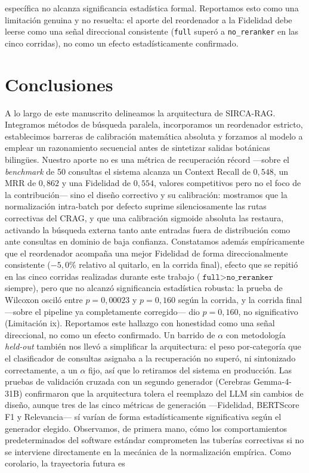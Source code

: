 \documentclass[runningheads]{llncs}
\newcommand{\sirca}{\textsc{SIRCA-RAG}}
\begin{document}
espec\'{i}fica no alcanza significancia estad\'{i}stica formal. Reportamos esto como una limitaci\'{o}n genuina y no resuelta: el aporte del reordenador a la Fidelidad debe leerse como una se\~{n}al direccional consistente (\texttt{full} super\'{o} a \texttt{no\_reranker} en las cinco corridas), no como un efecto estad\'{i}sticamente confirmado.

\section{Conclusiones}
\label{sec:conclusion}

A lo largo de este manuscrito delineamos la arquitectura de \sirca{}. Integramos m\'{e}todos de b\'{u}squeda paralela, incorporamos un reordenador estricto, establecimos barreras de calibraci\'{o}n matem\'{a}tica absoluta y forzamos al modelo a emplear un razonamiento secuencial antes de sintetizar salidas bot\'{a}nicas biling\"{u}es. Nuestro aporte no es una m\'{e}trica de recuperaci\'{o}n r\'{e}cord —sobre el \emph{benchmark} de 50 consultas el sistema alcanza un Context Recall de $0{,}548$, un MRR de $0{,}862$ y una Fidelidad de $0{,}554$, valores competitivos pero no el foco de la contribuci\'{o}n— sino el dise\~{n}o correctivo y su calibraci\'{o}n: mostramos que la normalizaci\'{o}n intra-batch por defecto suprime silenciosamente las rutas correctivas del CRAG, y que una calibraci\'{o}n sigmoide absoluta las restaura, activando la b\'{u}squeda externa tanto ante entradas fuera de distribuci\'{o}n como ante consultas en dominio de baja confianza. Constatamos adem\'{a}s emp\'{i}ricamente que el reordenador acompa\~{n}a una mejor Fidelidad de forma direccionalmente consistente ($-5{,}0\%$ relativo al quitarlo, en la corrida final), efecto que se repiti\'{o} en las cinco corridas realizadas durante este trabajo ($\texttt{full}{>}\texttt{no\_reranker}$ siempre), pero que no alcanz\'{o} significancia estad\'{i}stica robusta: la prueba de Wilcoxon oscil\'{o} entre $p{=}0{,}00023$ y $p{=}0{,}160$ seg\'{u}n la corrida, y la corrida final —sobre el pipeline ya completamente corregido— dio $p{=}0{,}160$, no significativo (Limitaci\'{o}n ix). Reportamos este hallazgo con honestidad como una se\~{n}al direccional, no como un efecto confirmado. Un barrido de $\alpha$ con metodolog\'{i}a \emph{held-out} tambi\'{e}n nos llev\'{o} a simplificar la arquitectura: el peso por-categor\'{i}a que el clasificador de consultas asignaba a la recuperaci\'{o}n no super\'{o}, ni sintonizado correctamente, a un $\alpha$ fijo, as\'{i} que lo retiramos del sistema en producci\'{o}n. Las pruebas de validaci\'{o}n cruzada con un segundo generador (Cerebras Gemma-4-31B) confirmaron que la arquitectura tolera el reemplazo del LLM sin cambios de dise\~{n}o, aunque tres de las cinco m\'{e}tricas de generaci\'{o}n —Fidelidad, BERTScore F1 y Relevancia— s\'{i} var\'{i}an de forma estad\'{i}sticamente significativa seg\'{u}n el generador elegido. Observamos, de primera mano, c\'{o}mo los comportamientos predeterminados del software est\'{a}ndar comprometen las tuber\'{i}as correctivas si no se interviene directamente en la mec\'{a}nica de la normalizaci\'{o}n emp\'{i}rica. Como corolario, la trayectoria futura es 
\end{document}
